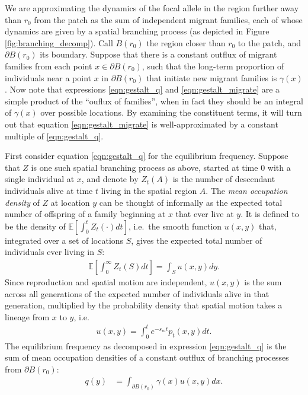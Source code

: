 \documentclass{article}
\newcommand{\E}{\mathbb{E}}
\begin{document}
We are approximating the dynamics of the focal allele in the region further away than $r_0$ from the patch
as the sum of independent migrant families, each of whose dynamics are
given by a spatial branching process (as depicted in Figure \ref{fig:branching_decomp}).
Call $B(r_0)$ the region closer than $r_0$ to the patch, and $\partial B(r_0)$ its boundary.
Suppose that there is a constant outflux of migrant families from each point $x \in \partial B(r_0)$,
such that the long-term proportion of individuals near a point $x$ in $\partial B(r_0)$ 
that initiate new migrant families is $\gamma(x)$.
Now note that expressions \eqref{eqn:gestalt_q} and \eqref{eqn:gestalt_migrate} are a simple product of the ``ouflux of families'',
when in fact they should be an integral of $\gamma(x)$ over possible locations. 
By examining the constituent terms,
it will turn out that equation \eqref{eqn:gestalt_migrate} 
is well-approximated by a constant multiple of \eqref{eqn:gestalt_q}.

First consider equation \eqref{eqn:gestalt_q} for the equilibrium frequency.
Suppose that $Z$ is one such spatial branching process as above, started at time 0 with a single individual at $x$,
and denote by $Z_t(A)$ is the number of descendant individuals alive at time $t$ living in the spatial region $A$.
The \emph{mean occupation density} of $Z$ at location $y$
can be thought of  informally 
as the expected total number of offspring of a family beginning at $x$ that ever live at $y$.
It is defined to be the density of $\E[\int_0^t Z_t(\cdot) dt]$,
i.e.\ the smooth function $u(x,y)$ that, integrated over a set of locations $S$, 
gives the expected total number of individuals ever living in $S$:
\begin{align} \label{eqn:occupation_density_defn}
    \E\left[ \int_0^\infty Z_t(S) dt \right] = \int_S u(x,y) dy .
\end{align}
Since reproduction and spatial motion are independent,
$u(x,y)$ is the sum across all generations of the expected number of individuals alive in that generation,
multiplied by the probability density that spatial motion takes a lineage from $x$ to $y$,
i.e.\
\begin{align}
    u(x,y) = \int_0^t e^{-s_m t} p_t(x,y) dt .
\end{align}
The equilibrium frequency as decomposed in expression \eqref{eqn:gestalt_q} 
is the sum of mean occupation densities of a constant outflux of branching processes
from $\partial B(r_0)$:
\begin{align} \label{eqn:occupation_integral}
    q(y) &= \int_{\partial B(r_0)} \gamma(x) u(x,y) dx  . %
\end{align}
\end{document}
